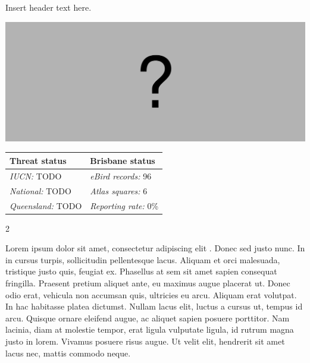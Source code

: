 \documentclass[12pt,openany,oneside]{book}
\let\origfigure\figure
\let\endorigfigure\endfigure
\renewenvironment{figure}[1][2] {
  \expandafter\origfigure\expandafter[H]
} {
  \endorigfigure
}
\let\Begin\begin
\let\End\end
\theoremstyle{definition}
\theoremstyle{definition}
\theoremstyle{definition}
\theoremstyle{remark}
\begin{document}

Insert header text here.

\begin{figure}
\centering
\includegraphics[width=\textwidth,keepaspectratio=true]{assets/misc/missing-profile.png}
\caption{Insert caption here.}
\end{figure}

\begin{tabu} to 
\toprule
Threat status & Brisbane status\\
\midrule
\textit{IUCN:} TODO & \textit{eBird records:} 96\\
\textit{National:} TODO & \textit{Atlas squares:} 6\\
\textit{Queensland:} TODO & \textit{Reporting rate:} 0\%\\
\bottomrule
\end{tabu} 
\vspace{0.15cm}

\Begin{multicols}{2}

Lorem ipsum dolor sit amet, consectetur adipiscing elit
\citep{rexample1, rexample2, rexample3}. Donec sed justo nunc. In in
cursus turpis, sollicitudin pellentesque lacus. Aliquam et orci
malesuada, tristique justo quis, feugiat ex. Phasellus at sem sit amet
sapien consequat fringilla. Praesent pretium aliquet ante, eu maximus
augue placerat ut. Donec odio erat, vehicula non accumsan quis,
ultricies eu arcu. Aliquam erat volutpat. In hac habitasse platea
dictumst. Nullam lacus elit, luctus a cursus ut, tempus id arcu. Quisque
ornare eleifend augue, ac aliquet sapien posuere porttitor. Nam lacinia,
diam at molestie tempor, erat ligula vulputate ligula, id rutrum magna
justo in lorem. Vivamus posuere risus augue. Ut velit elit, hendrerit
sit amet lacus nec, mattis commodo neque.

\End{multicols}

\clearpage
\end{document}
